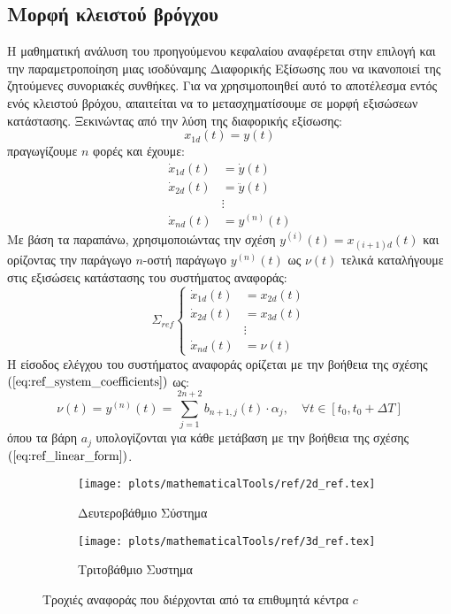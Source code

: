 \subsection{Μορφή κλειστού βρόγχου}
Η μαθηματική ανάλυση του προηγούμενου κεφαλαίου αναφέρεται στην επιλογή και την παραμετροποίηση μιας ισοδύναμης Διαφορικής Εξίσωσης που να ικανοποιεί της ζητούμενες συνοριακές συνθήκες. Για να χρησιμοποιηθεί αυτό το αποτέλεσμα εντός ενός κλειστού βρόχου, απαιτείται να το μετασχηματίσουμε σε μορφή εξισώσεων κατάστασης. Ξεκινώντας από την λύση της διαφορικής εξίσωσης:
\begin{equation*}
	x_{1d}(t) = y(t)
\end{equation*}
πραγωγίζουμε $n$ φορές και έχουμε:
\begin{equation*}
\begin{split}
	\dot{x}_{1d}(t) &= \dot{y}(t)  \\
	\dot{x}_{2d}(t) &= \ddot{y}(t) \\
	& \vdots \\
	\dot{x}_{nd}(t) &= y^{(n)}(t)
\end{split}
\end{equation*}
Με βάση τα παραπάνω, χρησιμοποιώντας την σχέση $y^{(i)}(t) = x_{(i+1)d}(t)$ και ορίζοντας την παράγωγο $n$-οστή παράγωγο $y^{(n)}(t)$ ως $\nu(t)$ τελικά καταλήγουμε στις εξισώσεις κατάστασης του συστήματος αναφοράς:
\begin{equation}
\Sigma_{ref}
\begin{cases}
\dot{x}_{1d}(t) &= x_{2d}(t)  \\
\dot{x}_{2d}(t) &= x_{3d}(t) \\
& \vdots \\
\dot{x}_{nd}(t) &= \nu(t)
\end{cases}
\label{eq:ref_system}
\end{equation}
Η είσοδος ελέγχου του συστήματος αναφοράς ορίζεται με την βοήθεια της σχέσης $(\ref{eq:ref_system_coefficients})$ ως:
\begin{equation*}
	\nu(t) = y^{(n)}(t) = \sum_{j=1}^{2n + 2} b_{n+1,j}(t) \cdot \alpha_j 
	,\quad \forall t \in [t_0,t_0+\Delta T]
\end{equation*}
όπου τα βάρη $a_j$ υπολογίζονται για κάθε μετάβαση με την βοήθεια της σχέσης $(\ref{eq:ref_linear_form})$.

\begin{figure}
	\begin{subfigure}{0.5\textwidth}
		\texttt{[image: plots/mathematicalTools/ref/2d\_ref.tex]}
		\caption{Δευτεροβάθμιο Σύστημα}
	\end{subfigure}
	\begin{subfigure}{0.5\textwidth}
		\texttt{[image: plots/mathematicalTools/ref/3d\_ref.tex]}
		\caption{Τριτοβάθμιο Συστημα}
	\end{subfigure}
	\caption{ Τροχιές αναφοράς που διέρχονται από τα επιθυμητά κέντρα $c$ }
	\label{fig:ref_trajectories}
\end{figure}

